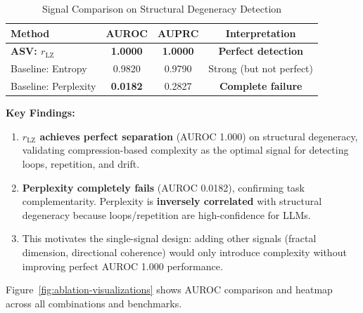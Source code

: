 \documentclass[11pt]{article}
\begin{document}
\begin{table}[h]
\centering
\caption{Signal Comparison on Structural Degeneracy Detection}
\label{tab:ablation-results}
\begin{tabular}{lccc}
\toprule
\textbf{Method} & \textbf{AUROC} & \textbf{AUPRC} & \textbf{Interpretation} \\
\midrule
\textbf{ASV: $r_{\text{LZ}}$} & \textbf{1.0000} & \textbf{1.0000} & \textbf{Perfect detection} \\
Baseline: Entropy & 0.9820 & 0.9790 & Strong (but not perfect) \\
Baseline: Perplexity & \textbf{0.0182} & 0.2827 & \textbf{Complete failure} \\
\bottomrule
\end{tabular}
\end{table}

\textbf{Key Findings:}
\begin{enumerate}
\item \textbf{$r_{\text{LZ}}$ achieves perfect separation} (AUROC 1.000) on structural degeneracy, validating compression-based complexity as the optimal signal for detecting loops, repetition, and drift.
\item \textbf{Perplexity completely fails} (AUROC 0.0182), confirming task complementarity. Perplexity is \textbf{inversely correlated} with structural degeneracy because loops/repetition are high-confidence for LLMs.
\item This motivates the single-signal design: adding other signals (fractal dimension, directional coherence) would only introduce complexity without improving perfect AUROC 1.000 performance.
\end{enumerate}

Figure~\ref{fig:ablation-visualizations} shows AUROC comparison and heatmap across all combinations and benchmarks.
\end{document}
